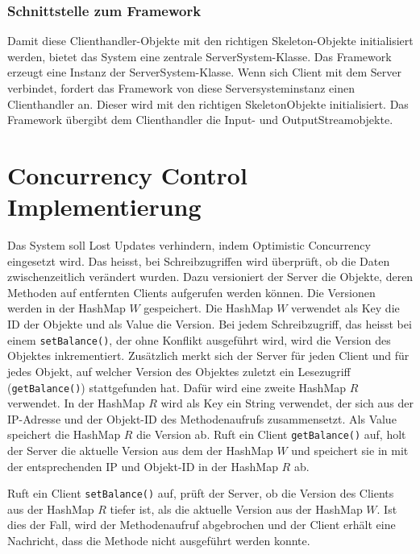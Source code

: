 \subsubsection{Schnittstelle zum Framework}
\label{sec:schn-zum-fram}

Damit diese Clienthandler-Objekte mit den
richtigen Skeleton-Objekte initialisiert werden, bietet das System
eine zentrale ServerSystem-Klasse. Das Framework erzeugt eine Instanz
der ServerSystem-Klasse. Wenn sich Client mit dem Server verbindet,
fordert das Framework von diese Serversystem\-instanz einen
Clienthandler an. Dieser wird mit den richtigen SkeletonObjekte
initialisiert. Das Framework übergibt dem Clienthandler die Input- und OutputStreamobjekte.

\section{Concurrency Control Implementierung }
\label{sec:conc-contr-impl}

Das System soll Lost Updates verhindern, indem Optimistic Concurrency
eingesetzt wird. Das heisst, bei Schreibzugriffen wird überprüft, ob die Daten zwischenzeitlich verändert wurden. Dazu
versioniert der Server die Objekte, deren Methoden auf entfernten
Clients aufgerufen werden können. Die Versionen werden in der HashMap
$W$ gespeichert. Die HashMap $W$ verwendet als Key die ID der Objekte
und als Value die Version. Bei jedem Schreibzugriff, das heisst bei
einem \verb|setBalance()|, der ohne Konflikt ausgeführt wird, wird die
Version des Objektes inkrementiert. Zusätzlich merkt sich der Server
für jeden Client und für jedes Objekt, auf welcher Version des
Objektes zuletzt ein Lesezugriff (\verb|getBalance()|) stattgefunden hat. Dafür
wird eine zweite HashMap $R$ verwendet. In der HashMap $R$ wird als Key
ein String verwendet, der sich aus der IP-Adresse und der
Objekt-ID des Methodenaufrufs zusammensetzt. Als Value speichert die HashMap $R$ die Version ab.
Ruft ein Client
\verb|getBalance()| auf, holt der Server die aktuelle Version aus dem
der HashMap $W$ und speichert sie in mit der entsprechenden IP und
Objekt-ID in der HashMap $R$ ab.

Ruft ein Client \verb|setBalance()| auf, prüft der Server, ob die
Version des Clients aus der HashMap $R$ tiefer ist, als die aktuelle
Version aus der HashMap $W$. Ist dies der Fall, wird der Methodenaufruf
abgebrochen und der Client erhält eine Nachricht, dass die Methode
nicht ausgeführt werden konnte.
